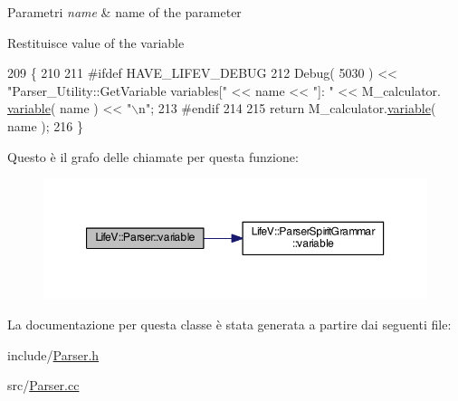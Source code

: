 \begin{DoxyParams}{Parametri}
{\em name} & name of the parameter \\
\hline
\end{DoxyParams}
\begin{DoxyReturn}{Restituisce}
value of the variable 
\end{DoxyReturn}

\begin{DoxyCode}
209 \{
210 
211 \textcolor{preprocessor}{#ifdef HAVE\_LIFEV\_DEBUG}
212 \textcolor{preprocessor}{}    Debug( 5030 ) << \textcolor{stringliteral}{"Parser\_Utility::GetVariable    variables["} << name << \textcolor{stringliteral}{"]: "} << M\_calculator.
      \hyperlink{classLifeV_1_1ParserSpiritGrammar_a768e48421db190a4eba5144932ddc4f6}{variable}( name ) << \textcolor{stringliteral}{"\(\backslash\)n"};
213 \textcolor{preprocessor}{#endif}
214 \textcolor{preprocessor}{}
215     \textcolor{keywordflow}{return} M\_calculator.\hyperlink{classLifeV_1_1ParserSpiritGrammar_a768e48421db190a4eba5144932ddc4f6}{variable}( name );
216 \}
\end{DoxyCode}


Questo è il grafo delle chiamate per questa funzione\-:\nopagebreak
\begin{figure}[H]
\begin{center}
\leavevmode
\includegraphics[width=350pt]{classLifeV_1_1Parser_a9fa902c13c73a3b1bc6db2b5e5c5c93d_cgraph}
\end{center}
\end{figure}




La documentazione per questa classe è stata generata a partire dai seguenti file\-:\begin{DoxyCompactItemize}
\item 
include/\hyperlink{Parser_8h}{Parser.\-h}\item 
src/\hyperlink{Parser_8cc}{Parser.\-cc}\end{DoxyCompactItemize}
